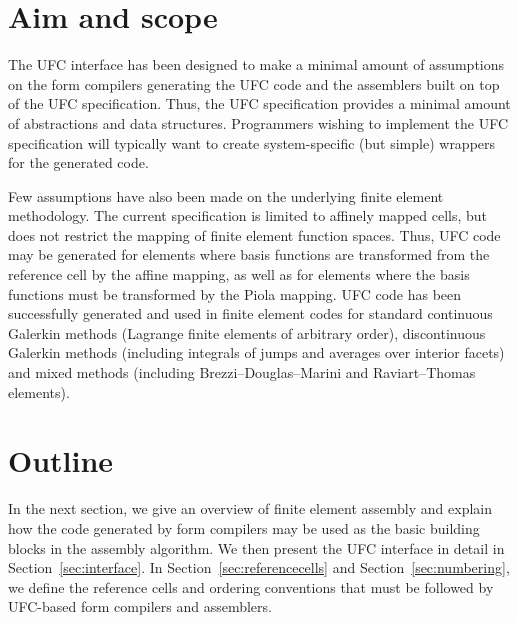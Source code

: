 \section{Aim and scope}

The UFC interface has been designed to make a minimal amount of
assumptions on the form compilers generating the UFC code and the
assemblers built on top of the UFC specification. Thus, the UFC
specification provides a minimal amount of abstractions and data
structures. Programmers wishing to implement the UFC specification
will typically want to create system-specific (but simple) wrappers
for the generated code.

Few assumptions have also been made on the underlying finite element
methodology. The current specification is limited to affinely mapped
cells, but does not restrict the mapping of finite element function
spaces. Thus, UFC code may be generated for elements where basis
functions are transformed from the reference cell by the affine
mapping, as well as for elements where the basis functions must be
transformed by the Piola mapping. UFC code has been successfully
generated and used in finite element codes for standard continuous
Galerkin methods (Lagrange finite elements of arbitrary order),
discontinuous Galerkin methods (including integrals of jumps and
averages over interior facets) and mixed methods (including
Brezzi--Douglas--Marini and Raviart--Thomas elements).

\section{Outline}

In the next section, we give an overview of finite element assembly
and explain how the code generated by form compilers may be used as
the basic building blocks in the assembly algorithm. We then present
the UFC interface in detail in Section~\ref{sec:interface}. In
Section~\ref{sec:referencecells} and Section~\ref{sec:numbering}, we
define the reference cells and ordering conventions that must be
followed by UFC-based form compilers and assemblers.
